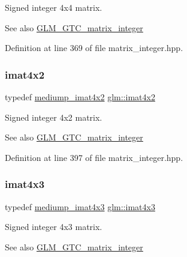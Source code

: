 Signed integer 4x4 matrix. \begin{DoxySeeAlso}{See also}
\mbox{\hyperlink{group__gtc__matrix__integer}{G\+L\+M\+\_\+\+G\+T\+C\+\_\+matrix\+\_\+integer}} 
\end{DoxySeeAlso}


Definition at line 369 of file matrix\+\_\+integer.\+hpp.

\mbox{\label{group__gtc__matrix__integer_ga7e733984837e0e7aa9f4aac18f632f63}} 
\subsubsection{\texorpdfstring{imat4x2}{imat4x2}}
{\footnotesize\ttfamily typedef \mbox{\hyperlink{group__gtc__matrix__integer_gabfe107153637dfd7a0c272ff1ba892ed}{mediump\+\_\+imat4x2}} \mbox{\hyperlink{group__gtc__matrix__integer_ga7e733984837e0e7aa9f4aac18f632f63}{glm\+::imat4x2}}}

Signed integer 4x2 matrix. \begin{DoxySeeAlso}{See also}
\mbox{\hyperlink{group__gtc__matrix__integer}{G\+L\+M\+\_\+\+G\+T\+C\+\_\+matrix\+\_\+integer}} 
\end{DoxySeeAlso}


Definition at line 397 of file matrix\+\_\+integer.\+hpp.

\mbox{\label{group__gtc__matrix__integer_gaa4cca8e80c0603239eda452860063844}} 
\subsubsection{\texorpdfstring{imat4x3}{imat4x3}}
{\footnotesize\ttfamily typedef \mbox{\hyperlink{group__gtc__matrix__integer_ga0da8b13e141337d016a6541ea2c0362c}{mediump\+\_\+imat4x3}} \mbox{\hyperlink{group__gtc__matrix__integer_gaa4cca8e80c0603239eda452860063844}{glm\+::imat4x3}}}

Signed integer 4x3 matrix. \begin{DoxySeeAlso}{See also}
\mbox{\hyperlink{group__gtc__matrix__integer}{G\+L\+M\+\_\+\+G\+T\+C\+\_\+matrix\+\_\+integer}} 
\end{DoxySeeAlso}


